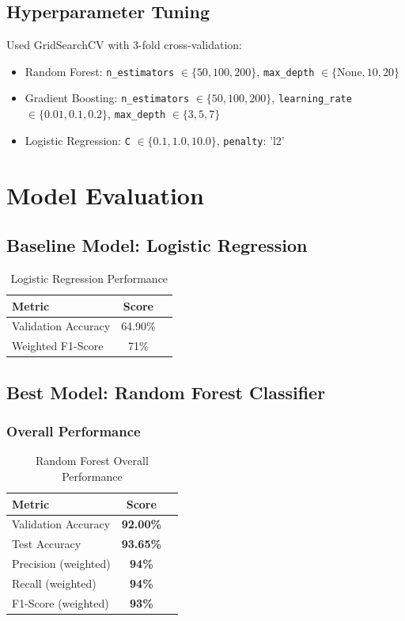 \documentclass[12pt,a4paper]{article}
\newcommand{\highlight}[1]{\textcolor{primaryblue}{\textbf{#1}}}
\newcommand{\metric}[1]{\textcolor{secondaryblue}{\textbf{#1}}}
\begin{document}
\subsection{Hyperparameter Tuning}
Used GridSearchCV with 3-fold cross-validation:
\begin{itemize}
    \item Random Forest: \texttt{n\_estimators} $\in \{50, 100, 200\}$, \texttt{max\_depth} $\in \{\text{None}, 10, 20\}$
    \item Gradient Boosting: \texttt{n\_estimators} $\in \{50, 100, 200\}$, \texttt{learning\_rate} $\in \{0.01, 0.1, 0.2\}$, \texttt{max\_depth} $\in \{3, 5, 7\}$
    \item Logistic Regression: \texttt{C} $\in \{0.1, 1.0, 10.0\}$, \texttt{penalty}: 'l2'
\end{itemize}

\section{Model Evaluation}

\subsection{Baseline Model: Logistic Regression}
\begin{table}[H]
\centering
\begin{tabular}{@{}lcc@{}}
\toprule
\textbf{Metric} & \textbf{Score} \\
\midrule
Validation Accuracy & 64.90\% \\
Weighted F1-Score & 71\% \\
\bottomrule
\end{tabular}
\caption{Logistic Regression Performance}
\label{tab:lr_perf}
\end{table}

\subsection{Best Model: Random Forest Classifier}

\subsubsection{Overall Performance}
\begin{table}[H]
\centering
\begin{tabular}{@{}lcc@{}}
\toprule
\textbf{Metric} & \textbf{Score} \\
\midrule
Validation Accuracy & \metric{92.00\%} \\
Test Accuracy & \highlight{93.65\%} \\
Precision (weighted) & \metric{94\%} \\
Recall (weighted) & \metric{94\%} \\
F1-Score (weighted) & \metric{93\%} \\
\bottomrule
\end{tabular}
\caption{Random Forest Overall Performance}
\label{tab:rf_overall}
\end{table}
\end{document}
